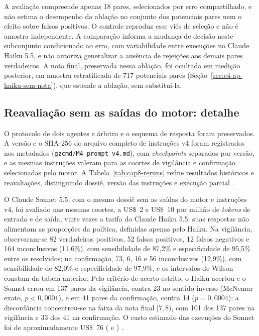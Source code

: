 A avaliação compreende apenas 18 pares, selecionados por erro compartilhado, e não estima o desempenho da ablação no conjunto dos potenciais pares nem o efeito sobre falsos positivos. O controle reproduz esse viés de seleção e não é amostra independente. A comparação informa a mudança de decisão neste subconjunto condicionado ao erro, com variabilidade entre execuções no Claude Haiku 5.5, e não autoriza generalizar a ausência de rejeições aos demais pares verdadeiros. A nota final, preservada nessa ablação, foi ocultada em medição posterior, em amostra estratificada de 717 potenciais pares (Seção~\ref{sec:e4-ap-haiku-sem-nota}), que estende a ablação, sem substituí-la.

\subsection{Reavaliação sem as saídas do motor: detalhe}\label{sec:e4-ap-reavaliacao}

O protocolo de dois agentes e árbitro e o esquema de resposta foram preservados. A versão e o SHA-256 do arquivo completo de instruções v4 foram registrados nos metadados (\texttt{gzcmd/M4\_prompt\_v4.md}), com \textit{checkpoints} separados por versão, e as mesmas instruções valeram para as coortes de vigilância e confirmação selecionadas pelo motor. A Tabela~\ref{tab:cap8-reruns} reúne resultados históricos e reavaliações, distinguindo dossiê, versão das instruções e execução parcial \cite{Jardim2026phdrepo}.



O Claude Sonnet 5.5, com o mesmo dossiê sem as saídas do motor e instruções v4, foi avaliado nas mesmas coortes, a US\$~2 e US\$~10 por milhão de \textit{tokens} de entrada e de saída, vinte vezes a tarifa do Claude Haiku 5.5; suas respostas não alimentam as proporções da política, definidas apenas pelo Haiku. Na vigilância, observaram-se 82 verdadeiros positivos, 52 falsos positivos, 12 falsos negativos e 164 inconclusivos (11,6\%), com sensibilidade de 87,2\% e especificidade de 95,5\% entre os resolvidos; na confirmação, 73, 6, 16 e 56 inconclusivos (12,9\%), com sensibilidade de 82,0\% e especificidade de 97,9\%, e os intervalos de Wilson constam da tabela anterior. Pelo critério de acerto estrito, o Haiku acertou e o Sonnet errou em 137 pares da vigilância, contra 23 no sentido inverso (McNemar exato, $p<0{,}0001$), e em 41 pares da confirmação, contra 14 ($p=0{,}0004$); a discordância concentrou-se na faixa da nota final $[7,8)$, com 101 dos 137 pares na vigilância e 33 dos 41 na confirmação. O custo estimado das execuções do Sonnet foi de aproximadamente US\$~76 ( e ) \cite{Jardim2026phdrepo}.

